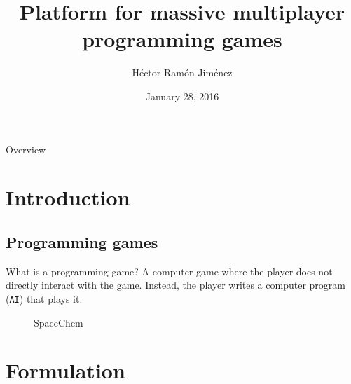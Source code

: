 \documentclass{beamer}
\title{Platform for massive multiplayer programming games}
\institute{Facultat d'Informàtica de Barcelona}
\author{Héctor Ramón Jiménez}
\date{January 28, 2016}
\begin{document}
\frame{\titlepage}
\begin{frame}{Overview}
\tableofcontents
\end{frame}
\section{Introduction}
\subsection{Programming games}
\begin{frame}{What is a programming game?}
A computer game where the player does not directly interact with the game. Instead, the player writes a computer program
    (\texttt{AI}) that plays it.
\begin{figure}[H]
\begin{center}
\noindent{}
\end{center}
\caption{SpaceChem \cite{spacechem}}
\end{figure}
\end{frame}
\section{Formulation}
\end{document}
